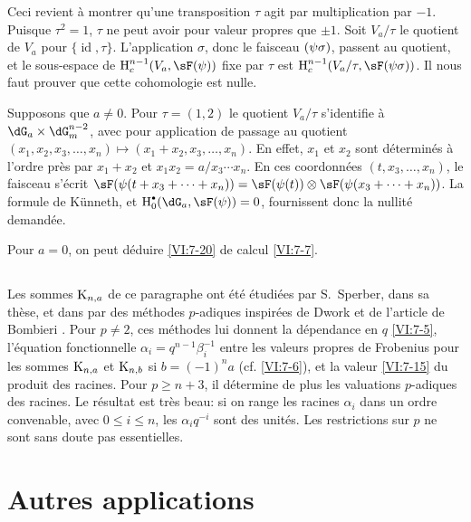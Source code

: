 Ceci revient à montrer qu'une transposition $\tau$ agit par multiplication 
par $-1$. Puisque $\tau^2=1$, $\tau$ ne peut avoir pour valeur propres que 
$\pm 1$. Soit $V_a/\tau$ le quotient de $V_a$ pour 
$\{\operatorname{id},\tau\}$. L'application $\sigma$, donc le faisceau 
$\sf(\psi\sigma)$, passent au quotient, et le sous-espace de 
$\h_c^{n-1}(V_a,\sF(\psi))$ fixe par 
$\tau$ est $\h_c^{n-1}(V_a/\tau,\sF(\psi\sigma))$. Il nous faut prouver que 
cette cohomologie est nulle. 

Supposons que $a\ne 0$. Pour $\tau=(1,2)$ le quotient $V_a/\tau$ s'identifie 
à $\dG_a\times \dG_m^{n-2}$, avec pour application de passage au quotient 
$(x_1,x_2,x_3,\dots,x_n)\mapsto (x_1+x_2,x_3,\dots,x_n)$. En effet, $x_1$ et 
$x_2$ sont déterminés à l'ordre près par $x_1+x_2$ et 
$x_1x_2 = a/x_3\dotsm x_n$. En ces coordonnées $(t,x_3,\dots,x_n)$, le 
faisceau s'écrit 
$\sF(\psi(t+x_3+\cdots + x_n)) = \sF(\psi(t))\otimes \sF(\psi(x_3+\cdots + x_n))$. 
La formule de K\"unneth, et $\h_0^\bullet(\dG_a,\sF(\psi)) = 0$, fournissent 
donc la nullité demandée. 

Pour $a=0$, on peut déduire \ref{VI:7-20} de calcul \ref{VI:7-7}. 





\subsection{}\label{VI:7-21}

Les sommes $\textnormal{K}_{n,a}$ de ce paragraphe ont été étudiées par 
S.\ Sperber, dans sa thèse, et dans \cite{sp77} par des méthodes 
$p$-adiques inspirées de Dwork et de l'article de Bombieri \cite{bo66}. 
Pour $p\ne 2$, ces méthodes lui donnent la dépendance en $q$ \ref{VI:7-5}, 
l'équation fonctionnelle $\alpha_i = q^{n-1} \beta_i^{-1}$ entre les 
valeurs propres de Frobenius pour les sommes $\textnormal{K}_{n,a}$ et 
$\textnormal{K}_{n,b}$ si $b=(-1)^n a$ (cf. \ref{VI:7-6}), et la valeur \ref{VI:7-15} 
du produit des racines. Pour $p\geqslant n+3$, il détermine de plus les 
valuations $p$-adiques des racines. Le résultat est très beau: si on range 
les racines $\alpha_i$ dans un ordre convenable, avec 
$0\leqslant i\leqslant n$, les $\alpha_i q^{-i}$ sont des unités. Les 
restrictions sur $p$ ne sont sans doute pas essentielles. 










\section{Autres applications}\label{VI:8}





